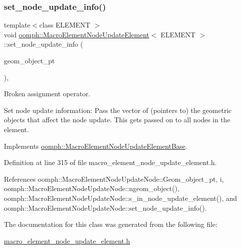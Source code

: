 \subsubsection{\texorpdfstring{set\+\_\+node\+\_\+update\+\_\+info()}{set\_node\_update\_info()}}
{\footnotesize\ttfamily template$<$class E\+L\+E\+M\+E\+NT $>$ \\
void \hyperlink{classoomph_1_1MacroElementNodeUpdateElement}{oomph\+::\+Macro\+Element\+Node\+Update\+Element}$<$ E\+L\+E\+M\+E\+NT $>$\+::set\+\_\+node\+\_\+update\+\_\+info (\begin{DoxyParamCaption}\item[{const \hyperlink{classoomph_1_1Vector}{Vector}$<$ \hyperlink{classoomph_1_1GeomObject}{Geom\+Object} $\ast$$>$ \&}]{geom\+\_\+object\+\_\+pt }\end{DoxyParamCaption})\hspace{0.3cm}{\ttfamily [inline]}, {\ttfamily [virtual]}}



Broken assignment operator. 

Set node update information\+: Pass the vector of (pointers to) the geometric objects that affect the node update. This gets passed on to all nodes in the element. 

Implements \hyperlink{classoomph_1_1MacroElementNodeUpdateElementBase_a21fd47abb3a0fff0920e4b70b9186199}{oomph\+::\+Macro\+Element\+Node\+Update\+Element\+Base}.



Definition at line 315 of file macro\+\_\+element\+\_\+node\+\_\+update\+\_\+element.\+h.



References oomph\+::\+Macro\+Element\+Node\+Update\+Node\+::\+Geom\+\_\+object\+\_\+pt, i, oomph\+::\+Macro\+Element\+Node\+Update\+Node\+::ngeom\+\_\+object(), oomph\+::\+Macro\+Element\+Node\+Update\+Node\+::s\+\_\+in\+\_\+node\+\_\+update\+\_\+element(), and oomph\+::\+Macro\+Element\+Node\+Update\+Node\+::set\+\_\+node\+\_\+update\+\_\+info().



The documentation for this class was generated from the following file\+:\begin{DoxyCompactItemize}
\item 
\hyperlink{macro__element__node__update__element_8h}{macro\+\_\+element\+\_\+node\+\_\+update\+\_\+element.\+h}\end{DoxyCompactItemize}
